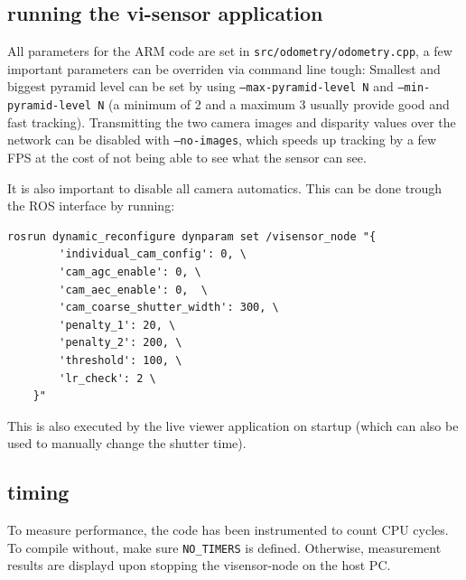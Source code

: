 \subsection{running the vi-sensor application}

All parameters for the ARM code are set in \texttt{src/odometry/odometry.cpp},
a few important parameters can be overriden via command line tough: Smallest
and biggest pyramid level can be set by using \texttt{--max-pyramid-level N}
and \texttt{--min-pyramid-level N} (a minimum of 2 and a maximum 3 usually
provide good and fast tracking). Transmitting the two camera images and
disparity values over the network can be disabled with \texttt{--no-images},
which speeds up tracking by a few FPS at the cost of not being able to see what
the sensor can see.

It is also important to disable all camera automatics. This can be done trough
the ROS interface by running:

\begin{verbatim}
rosrun dynamic_reconfigure dynparam set /visensor_node "{
        'individual_cam_config': 0, \
        'cam_agc_enable': 0, \
        'cam_aec_enable': 0,  \
        'cam_coarse_shutter_width': 300, \
        'penalty_1': 20, \
        'penalty_2': 200, \
        'threshold': 100, \
        'lr_check': 2 \
    }"
\end{verbatim}

This is also executed by the live viewer application on startup (which can also
be used to manually change the shutter time).


\subsection{timing}

To measure performance, the code has been instrumented to count CPU cycles. To
compile without, make sure \texttt{NO\_TIMERS} is defined. Otherwise,
measurement results are displayd upon stopping the visensor-node on the host
PC.
